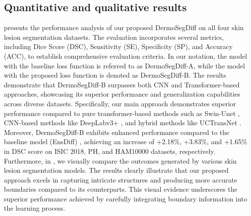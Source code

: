 \documentclass[runningheads]{llncs}
\begin{document}
\subsection{Quantitative and qualitative results}
 presents the performance analysis of our proposed DermoSegDiff on all four skin lesion segmentation datasets. The evaluation incorporates several metrics, including Dice Score (DSC), Sensitivity (SE), Specificity (SP), and Accuracy (ACC), to establish comprehensive evaluation criteria. In our notation, the model with the baseline loss function is referred to as DermoSegDiff-A, while the model with the proposed loss function is denoted as DermoSegDiff-B. The results demonstrate that DermoSegDiff-B surpasses both CNN and Transformer-based approaches, showcasing its superior performance and generalization capabilities across diverse datasets.  Specifically, our main approach demonstrates superior performance compared to pure transformer-based methods such as Swin-Unet \cite{cao2021swin}, CNN-based methods like DeepLabv3+ \cite{chen2018encoder}, and hybrid methods like UCTransNet \cite{wang2022uctransnet}. Moreover, DermoSegDiff-B exhibits enhanced performance compared to the baseline model (EnsDiff) \cite{wolleb2022diffusion}, achieving an increase of +2.18\%, +3.83\%, and +1.65\% in DSC score on ISIC 2018, PH, and HAM10000 datasets, respectively. Furthermore, in , we visually compare the outcomes generated by various skin lesion segmentation models. The results clearly illustrate that our proposed approach excels in capturing intricate structures and producing more accurate boundaries compared to its counterparts. This visual evidence underscores the superior performance achieved by carefully integrating boundary information into the learning process.
\end{document}
